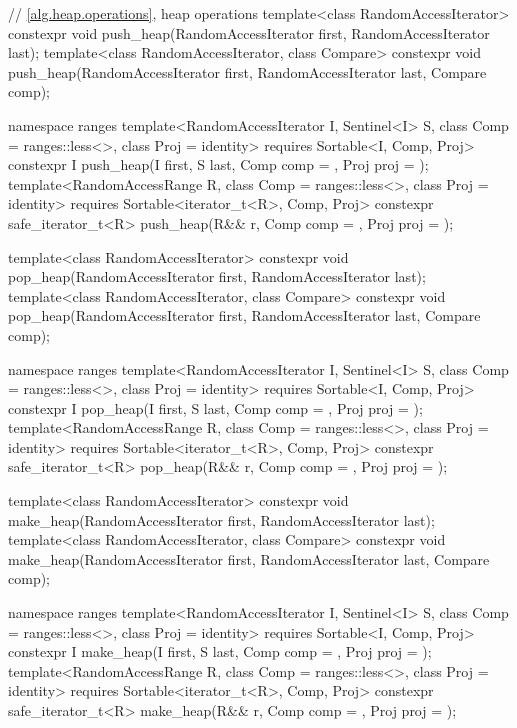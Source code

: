 \begin{codeblock}
{  // \ref{alg.heap.operations}, heap operations
  template<class RandomAccessIterator>
    constexpr void push_heap(RandomAccessIterator first, RandomAccessIterator last);
  template<class RandomAccessIterator, class Compare>
    constexpr void push_heap(RandomAccessIterator first, RandomAccessIterator last,
                             Compare comp);

  namespace ranges {
    template<RandomAccessIterator I, Sentinel<I> S, class Comp = ranges::less<>,
             class Proj = identity>
      requires Sortable<I, Comp, Proj>
      constexpr I
        push_heap(I first, S last, Comp comp = {}, Proj proj = {});
    template<RandomAccessRange R, class Comp = ranges::less<>, class Proj = identity>
      requires Sortable<iterator_t<R>, Comp, Proj>
      constexpr safe_iterator_t<R>
        push_heap(R&& r, Comp comp = {}, Proj proj = {});
  }

  template<class RandomAccessIterator>
    constexpr void pop_heap(RandomAccessIterator first, RandomAccessIterator last);
  template<class RandomAccessIterator, class Compare>
    constexpr void pop_heap(RandomAccessIterator first, RandomAccessIterator last,
                            Compare comp);

  namespace ranges {
    template<RandomAccessIterator I, Sentinel<I> S, class Comp = ranges::less<>,
             class Proj = identity>
      requires Sortable<I, Comp, Proj>
      constexpr I
        pop_heap(I first, S last, Comp comp = {}, Proj proj = {});
    template<RandomAccessRange R, class Comp = ranges::less<>, class Proj = identity>
      requires Sortable<iterator_t<R>, Comp, Proj>
      constexpr safe_iterator_t<R>
        pop_heap(R&& r, Comp comp = {}, Proj proj = {});
  }

  template<class RandomAccessIterator>
    constexpr void make_heap(RandomAccessIterator first, RandomAccessIterator last);
  template<class RandomAccessIterator, class Compare>
    constexpr void make_heap(RandomAccessIterator first, RandomAccessIterator last,
                             Compare comp);

  namespace ranges {
    template<RandomAccessIterator I, Sentinel<I> S, class Comp = ranges::less<>,
             class Proj = identity>
      requires Sortable<I, Comp, Proj>
      constexpr I
        make_heap(I first, S last, Comp comp = {}, Proj proj = {});
    template<RandomAccessRange R, class Comp = ranges::less<>, class Proj = identity>
      requires Sortable<iterator_t<R>, Comp, Proj>
      constexpr safe_iterator_t<R>
        make_heap(R&& r, Comp comp = {}, Proj proj = {});
  }

}
\end{codeblock}
